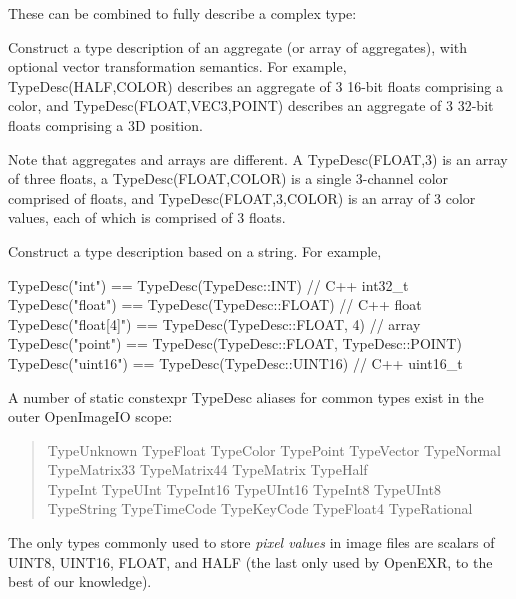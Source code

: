 \noindent These can be combined to fully describe a complex type:

Construct a type description of an aggregate (or array of aggregates),
with optional vector transformation semantics.  For example, 
{\cf TypeDesc(HALF,COLOR)} describes an aggregate of 3 16-bit floats
comprising a color, and {\cf TypeDesc(FLOAT,VEC3,POINT)} describes 
an aggregate of 3 32-bit floats comprising a 3D position.

Note that aggregates and arrays are different.  A {\cf
  TypeDesc(FLOAT,3)} is an array of three floats, a {\cf
  TypeDesc(FLOAT,COLOR)} is a single 3-channel color comprised of
floats, and {\cf TypeDesc(FLOAT,3,COLOR)} is an array of 3 color values,
each of which is comprised of 3 floats.
\apiend

Construct a type description based on a string. For example,

\begin{code}
    TypeDesc("int") == TypeDesc(TypeDesc::INT)       // C++ int32_t
    TypeDesc("float") == TypeDesc(TypeDesc::FLOAT)   // C++ float
    TypeDesc("float[4]") == TypeDesc(TypeDesc::FLOAT, 4)  // array
    TypeDesc("point") == TypeDesc(TypeDesc::FLOAT, TypeDesc::POINT)
    TypeDesc("uint16") == TypeDesc(TypeDesc::UINT16)   // C++ uint16_t
\end{code}
\apiend

\bigskip

A number of {\cf static constexpr TypeDesc} aliases for common types exist
in the outer {\cf OpenImageIO} scope:

\begin{quote}
{\cf
TypeUnknown
TypeFloat
TypeColor
TypePoint
TypeVector
TypeNormal \\
TypeMatrix33
TypeMatrix44
TypeMatrix
TypeHalf \\
TypeInt
TypeUInt
TypeInt16
TypeUInt16
TypeInt8
TypeUInt8 \\
TypeString
TypeTimeCode
TypeKeyCode
TypeFloat4
TypeRational
}
\end{quote}

The only types commonly used to store \emph{pixel values} in image files
are scalars of {\cf UINT8}, {\cf UINT16}, {\cf FLOAT}, and {\cf HALF}
(the last only used by OpenEXR, to the best of our knowledge).

